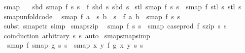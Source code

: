 \begin{isabellebody}
{\isafolddocument}%
%
\isadelimdocument
%
\endisadelimdocument
{}\isamarkupfalse%
\ smap{}\ \isanewline
\ \ {\isachardoublequoteopen}shd\ {\isacharparenleft}smap{}\ f\ s{}\ s{}{\isacharparenright}\ {\isacharequal}\ f\ {\isacharparenleft}shd\ s{}{\isacharparenright}\ {\isacharparenleft}shd\ s{}{\isacharparenright}{\isachardoublequoteclose}\isanewline
{\isacharbar}\ {\isachardoublequoteopen}stl\ {\isacharparenleft}smap{}\ f\ s{}\ s{}{\isacharparenright}\ {\isacharequal}\ smap{}\ f\ {\isacharparenleft}stl\ s{}{\isacharparenright}\ {\isacharparenleft}stl\ s{}{\isacharparenright}{\isachardoublequoteclose}\isanewline
\isanewline
{}\isamarkupfalse%
\ smap{}{\isacharunderscore}unfold{\isacharbrackleft}code{\isacharbrackright}{\isacharcolon}\isanewline
\ \ {\isachardoublequoteopen}smap{}\ f\ {\isacharparenleft}a\ {\isacharhash}{\isacharhash}\ s{}{\isacharparenright}\ {\isacharparenleft}b\ {\isacharhash}{\isacharhash}\ s{}{\isacharparenright}\ {\isacharequal}\ f\ a\ b\ {\isacharhash}{\isacharhash}\ {\isacharparenleft}smap{}\ f\ s{}\ s{}{\isacharparenright}{\isachardoublequoteclose}\isanewline
%
\isadelimproof
\ \ %
\endisadelimproof
%
\isatagproof
{}\isamarkupfalse%
\ {\isacharparenleft}subst\ smap{}{\isachardot}ctr{\isacharparenright}\ simp%
\endisatagproof
{\isafoldproof}%
%
\isadelimproof
\isanewline
%
\endisadelimproof
\isanewline
{}\isamarkupfalse%
\ smap{}{\isacharunderscore}szip{\isacharcolon}\isanewline
\ \ {\isachardoublequoteopen}smap{}\ f\ s{}\ s{}\ {\isacharequal}\ smap\ {\isacharparenleft}case{\isacharunderscore}prod\ f{\isacharparenright}\ {\isacharparenleft}szip\ s{}\ s{}{\isacharparenright}{\isachardoublequoteclose}\isanewline
%
\isadelimproof
\ \ %
\endisadelimproof
%
\isatagproof
{}\isamarkupfalse%
\ {\isacharparenleft}coinduction\ arbitrary{\isacharcolon}\ s{}\ s{}{\isacharparenright}\ auto%
\endisatagproof
{\isafoldproof}%
%
\isadelimproof
\isanewline
%
\endisadelimproof
\isanewline
{}\isamarkupfalse%
\ smap{\isacharunderscore}smap{}{\isacharbrackleft}simp{\isacharbrackright}{\isacharcolon}\isanewline
\ \ {\isachardoublequoteopen}smap\ f\ {\isacharparenleft}smap{}\ g\ s{}\ s{}{\isacharparenright}\ {\isacharequal}\ smap{}\ {\isacharparenleft}{\isasymlambda}x\ y{\isachardot}\ f\ {\isacharparenleft}g\ x\ y{\isacharparenright}{\isacharparenright}\ s{}\ s{}{\isachardoublequoteclose}\isanewline

\end{isabellebody}
